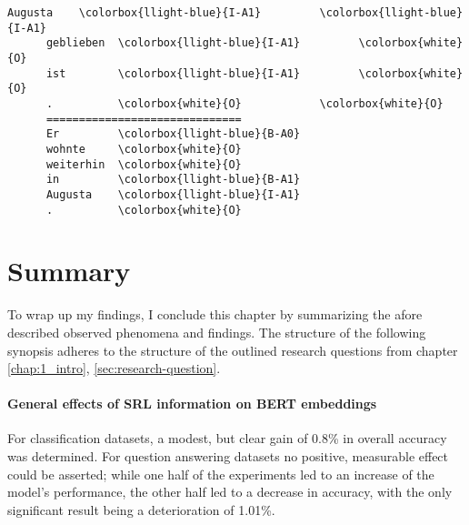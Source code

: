 {\begin{srl}[!h]
\begin{minipage}{0.45\linewidth}
\begin{BVerbatim}[commandchars=\\\{\}, fontsize=\footnotesize]
      Augusta    \colorbox{llight-blue}{I-A1}         \colorbox{llight-blue}{I-A1}
      geblieben  \colorbox{llight-blue}{I-A1}         \colorbox{white}{O}
      ist        \colorbox{llight-blue}{I-A1}         \colorbox{white}{O}
      .          \colorbox{white}{O}            \colorbox{white}{O}
      ==============================
      Er         \colorbox{llight-blue}{B-A0}
      wohnte     \colorbox{white}{O}
      weiterhin  \colorbox{white}{O}
      in         \colorbox{llight-blue}{B-A1}
      Augusta    \colorbox{llight-blue}{I-A1}
      .          \colorbox{white}{O}
    \end{BVerbatim}
  \end{minipage}
\end{srl}
\label{srl:ablation}
\endgroup


\newpage
\section{Summary}

To wrap up my findings, I conclude this chapter by summarizing the afore described observed
phenomena and findings. The structure of the following synopsis adheres to the structure of
the outlined research questions from chapter \ref{chap:1_intro}, \ref{sec:research-question}.


\paragraph*{General effects of SRL information on BERT embeddings}

For classification datasets, a modest, but clear gain of 0.8\% in overall accuracy was
determined. For question answering datasets
no positive, measurable effect could be asserted; while one half of the experiments led to
an increase of the model's performance, the other half led to a decrease in accuracy, with
the only significant result being a deterioration of 1.01\%.

}
